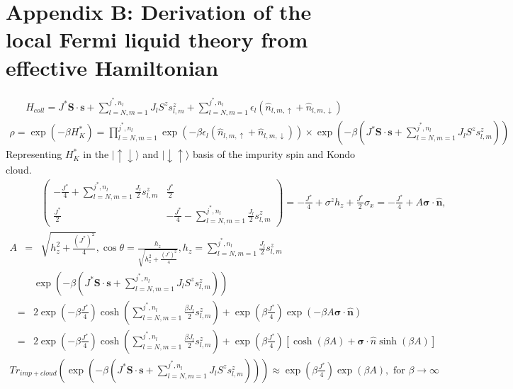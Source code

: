 \documentclass[aps,prl,preprint,groupedaddress]{revtex4-2}
\begin{document}
\section*{Appendix B: Derivation of the local Fermi liquid theory from effective Hamiltonian}
\begin{eqnarray}
H_{coll}=J^{*}\mathbf{S}\cdot\mathbf{s}+\sum_{l=N,m=1}^{j^{*},n_{l}}J_{l}S^{z}s^{z}_{l,m}
+\sum_{l=N,m=1}^{j^{*},n_{l}}\epsilon_{l}(\hat{n}_{l,m,\uparrow}+\hat{n}_{l,m,\downarrow})
\end{eqnarray}
\begin{eqnarray}
\rho=\exp(-\beta H^{*}_{K})=\prod_{l=N,m=1}^{j^{*},n_{l}}\exp(-\beta\epsilon_{l}(\hat{n}_{l,m,\uparrow}+\hat{n}_{l,m,\downarrow}))\times\exp(-\beta(J^{*}\mathbf{S}\cdot\mathbf{s}+\sum_{l=N,m=1}^{j^{*},n_{l}}J_{l}S^{z}s^{z}_{l,m}))~~~~~
\end{eqnarray}
Representing $H^{*}_{K}$ in the $|\uparrow\downarrow\rangle$ and $|\downarrow\uparrow\rangle$ basis of the impurity spin and Kondo cloud.
\begin{eqnarray}
&&\begin{pmatrix}-\frac{J^{*}}{4}+\sum_{l=N,m=1}^{j^{*},n_{l}}\frac{J_{l}}{2}s^{z}_{l,m} & \frac{J^{*}}{2}\\ 
\frac{J^{*}}{2} & -\frac{J^{*}}{4}-\sum_{l=N,m=1}^{j^{*},n_{l}}\frac{J_{l}}{2}s^{z}_{l,m}\end{pmatrix}=-\frac{J^{*}}{4}+\sigma^{z}h_{z}+\frac{J^{*}}{2}\sigma_{x}=-\frac{J^{*}}{4}+A\boldsymbol{\sigma}\cdot\mathbf{\hat{n}},\nonumber\\
 A&=&\sqrt{h^{2}_{z}+\frac{(J^{*})^{2}}{4}},\cos\theta=\frac{h_{z}}{\sqrt{h^{2}_{z}+\frac{(J^{*})^{2}}{4}}}, h_{z}=\sum_{l=N,m=1}^{j^{*},n_{l}}\frac{J_{l}}{2}s^{z}_{l,m}
\end{eqnarray}
\begin{eqnarray}
&&\exp(-\beta(J^{*}\mathbf{S}\cdot\mathbf{s}+\sum_{l=N,m=1}^{j^{*},n_{l}}J_{l}S^{z}s^{z}_{l,m}))\nonumber\\
&=&2\exp(-\beta\frac{J^{*}}{4})\cosh\left(\sum_{l=N,m=1}^{j^{*},n_{l}}\frac{\beta J_{l}}{2}s^{z}_{l,m}\right)+\exp(\beta\frac{J^{*}}{4})\exp\left(-\beta A\mathbf{\sigma}\cdot\hat{\mathbf{n}}\right)\nonumber\\
&=&2\exp(-\beta\frac{J^{*}}{4})\cosh\left(\sum_{l=N,m=1}^{j^{*},n_{l}}\frac{\beta J_{l}}{2}s^{z}_{l,m}\right)+\exp(\beta\frac{J^{*}}{4})\left[\cosh(\beta A)+\boldsymbol{\sigma}\cdot\hat{n}\sinh(\beta A)\right]
\end{eqnarray}
\begin{eqnarray}
Tr_{imp+cloud}(\exp(-\beta(J^{*}\mathbf{S}\cdot\mathbf{s}+\sum_{l=N,m=1}^{j^{*},n_{l}}J_{l}S^{z}s^{z}_{l,m})))\approx \exp(\beta\frac{J^{*}}{4})\exp(\beta A), \text{ for }\beta\to \infty
\end{eqnarray}
\end{document}
